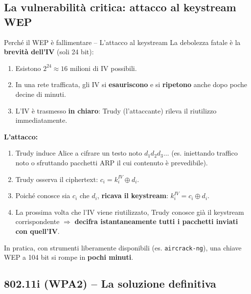 \documentclass[a4paper,12pt]{report}
\begin{document}
\subsection{La vulnerabilit\`a critica: attacco al keystream WEP}


\begin{urgentbox}{Perch\'e il WEP \`e fallimentare -- L'attacco al keystream}
La debolezza fatale \`e la \textbf{brevit\`a dell'IV} (soli 24 bit):

\begin{enumerate}[noitemsep]
  \item Esistono $2^{24} \approx 16$ milioni di IV possibili.
  \item In una rete trafficata, gli IV si \textbf{esauriscono} e si \textbf{ripetono}
        anche dopo poche decine di minuti.
  \item L'IV \`e trasmesso \textbf{in chiaro}: Trudy (l'attaccante) rileva
        il riutilizzo immediatamente.
\end{enumerate}

\textbf{L'attacco:}
\begin{enumerate}[noitemsep]
  \item Trudy induce Alice a cifrare un testo noto $d_1 d_2 d_3 \ldots$
        (es. iniettando traffico noto o sfruttando pacchetti ARP il cui contenuto \`e prevedibile).
  \item Trudy osserva il ciphertext: $c_i = k_i^{IV} \oplus d_i$.
  \item Poich\'e conosce sia $c_i$ che $d_i$, \textbf{ricava il keystream}: $k_i^{IV} = c_i \oplus d_i$.
  \item La prossima volta che l'IV viene riutilizzato, Trudy conosce gi\`a il keystream
        corrispondente $\Rightarrow$ \textbf{decifra istantaneamente tutti i pacchetti
        inviati con quell'IV}.
\end{enumerate}
In pratica, con strumenti liberamente disponibili (es. \texttt{aircrack-ng}),
una chiave WEP a 104 bit si rompe in \textbf{pochi minuti}.
\end{urgentbox}

\newpage
\subsection{802.11i (WPA2) -- La soluzione definitiva}
\end{document}
